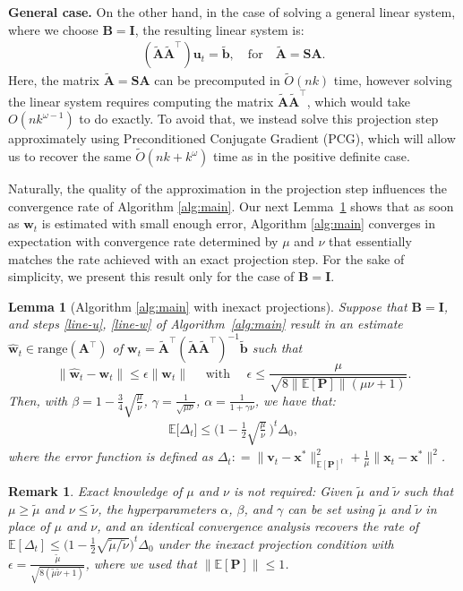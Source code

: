\documentclass[11pt]{article}
\let\origtop\top
\renewcommand\top{{\scriptscriptstyle{\origtop}}}
\def\x{{\mathbf x}}
\def\w{{\mathbf w}}
\def\v{{\mathbf v}}
\def\u{{\mathbf u}}
\def\b{{\mathbf b}}
\def\A{{\mathbf A}}
\def\B{{\mathbf B}}
\def\I{{\mathbf I}}
\def\S{{\mathbf S}}
\def\P{{\mathbf P}}
\def\E{{\mathds E}}
\newtheorem{lem}[thm]{Lemma}
\newtheorem{remark}[thm]{Remark}
\begin{document}
\noindent
\textbf{General case.} On the other hand, in the case of solving a general linear system, where we choose $\B=\I$, the resulting linear system is:
\begin{align*}
    (\tilde\A\tilde\A^\top)\u_t=\tilde\b,\quad\text{for}\quad \tilde\A=\S\A.
\end{align*}
Here, the matrix $\tilde\A=\S\A$ can be precomputed in $\tilde O(nk)$ time, however solving the linear system requires computing the matrix $\tilde\A\tilde\A^\top$, which would take $O(nk^{\omega-1})$ to do exactly. To avoid that, we instead solve this projection step approximately using Preconditioned Conjugate Gradient (PCG), which will allow us to recover the same $\tilde O(nk+k^\omega)$ time as in the positive definite case.

Naturally, the quality of the approximation in the projection step influences the convergence rate of Algorithm \ref{alg:main}. Our next Lemma~\ref{lem:approx_inv} shows that as soon as $\w_t$ is estimated with small enough error, Algorithm \ref{alg:main} converges in expectation with convergence rate determined by $\mu$ and $\nu$ that essentially matches the rate achieved with an exact projection step. For the sake of simplicity, we present this result only for the case of $\B=\I$.
\begin{lem}[Algorithm \ref{alg:main} with inexact projections]\label{lem:approx_inv}
Suppose that $\B=\I$, and steps \ref{line-u}, \ref{line-w} of Algorithm~\ref{alg:main} result in an estimate $\hat\w_t \in\text{range}(\A^\top)$ of $\w_t = \tilde\A^\top(\tilde\A\tilde\A^\top)^{-1}\tilde\b$ such that 
$$\|\hat\w_t-\w_t\|\leq \epsilon \|\w_t\| \quad \text{  with }\quad  \epsilon \le \frac{\mu}{\sqrt{8\|\E[\P]\|(\mu \nu + 1)}}.$$ 
Then, with $\beta=1-\frac{3}{4} \sqrt{\frac{\mu}{\nu}}$, $\gamma=\frac1{\sqrt{\mu\nu}}$, $\alpha=\frac1{1+\gamma\nu}$, we have that:
    \begin{align*}
\E\big[\Delta_t\big] \leq \bigg(1-\frac{1}{2}\sqrt{\frac{\mu}{\nu}}\,\bigg)^t\Delta_0,
    \end{align*}   
    where the error function is defined as $\Delta_t: =
\|\v_t-\x^*\|_{\E[\P]^\dagger}^2+
\frac{1}{\mu}
\|\x_t-\x^*\|^2$.
\end{lem}
\begin{remark}
    Exact knowledge of $\mu$ and $\nu$ is not required: Given $\tilde\mu$ and $\tilde\nu$ such that $\mu\geq\tilde\mu$ and $\nu\leq \tilde\nu$, the hyperparameters $\alpha$, $\beta$, and $\gamma$ can be set using $\tilde\mu$ and $\tilde\nu$ in place of $\mu$ and $\nu$, and an identical convergence analysis recovers the rate of $\E[\Delta_t]\leq\big(1-\frac12\sqrt{\tilde\mu/\tilde\nu}\big)^t\Delta_0$ under the  inexact projection condition with $\epsilon =\frac{\tilde\mu}{\sqrt{8(\tilde\mu\tilde\nu+1)}}$, where we used that $\|\E[\P]\|\leq 1$.
\end{remark}
\end{document}
